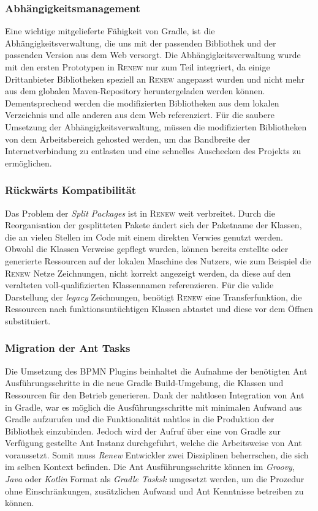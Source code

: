  \subsubsection{Abhängigkeitsmanagement}
	Eine wichtige mitgelieferte Fähigkeit von Gradle, ist die Abhängigkeitsverwaltung, die uns mit der passenden Bibliothek und der passenden Version aus dem Web versorgt. Die Abhängigkeitsverwaltung wurde mit den ersten Prototypen in \textsc{Renew} nur zum Teil integriert, da einige Drittanbieter Bibliotheken speziell an \textsc{Renew} angepasst wurden und nicht mehr aus dem globalen Maven-Repository heruntergeladen werden können. Dementsprechend werden die modifizierten Bibliotheken aus dem lokalen Verzeichnis und alle anderen aus dem Web referenziert.\newline
	Für die saubere Umsetzung der Abhängigkeitsverwaltung, müssen die modifizierten Bibliotheken von dem Arbeitsbereich gehosted werden, um das Bandbreite der Internetverbindung zu entlasten und eine schnelles Auschecken des Projekts zu ermöglichen. 	
	
 \subsubsection{Rückwärts Kompatibilität}
	Das Problem der \textit{Split Packages} ist in \textsc{Renew} weit verbreitet. Durch die Reorganisation der gesplitteten Pakete ändert sich der Paketname der Klassen, die an vielen Stellen im Code mit einem direkten Verwies genutzt werden. Obwohl die Klassen Verweise gepflegt wurden, können bereits erstellte oder generierte Ressourcen auf der lokalen Maschine des Nutzers, wie zum Beispiel die \textsc{Renew} Netze Zeichnungen, nicht korrekt angezeigt werden, da diese auf den veralteten voll-qualifizierten Klassennamen referenzieren.\newline
	Für die valide Darstellung der \textit{legacy} Zeichnungen, benötigt \textsc{Renew} eine Transferfunktion, die Ressourcen nach funktionsuntüchtigen Klassen abtastet und diese vor dem Öffnen substituiert.
	
 \subsubsection{Migration der Ant Tasks}
	Die Umsetzung des BPMN Plugins beinhaltet die Aufnahme der benötigten Ant Ausführungsschritte in die neue Gradle Build-Umgebung, die Klassen und Ressourcen für den Betrieb generieren. Dank der nahtlosen Integration von Ant in Gradle, war es möglich die Ausführungsschritte mit minimalen Aufwand aus Gradle aufzurufen und die Funktionalität nahtlos in die Produktion der Bibliothek einzubinden. Jedoch wird der Aufruf über eine von Gradle zur Verfügung gestellte Ant Instanz durchgeführt, welche die Arbeitsweise von Ant voraussetzt. Somit muss \textit{Renew} Entwickler zwei Disziplinen beherrschen, die sich im selben Kontext befinden.\newline
	Die Ant Ausführungsschritte können im \textit{Groovy}, \textit{Java} oder \textit{Kotlin} Format als \textit{Gradle Tasksk} umgesetzt werden, um die Prozedur ohne Einschränkungen, zusätzlichen Aufwand und Ant Kenntnisse betreiben zu können. 
	
